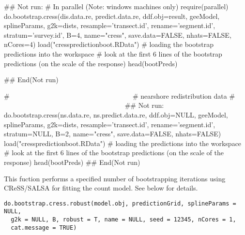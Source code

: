 \documentclass[a4paper]{book}
\begin{document}
\begin{Examples}
\begin{ExampleCode}
## Not run: 
# In parallel (Note: windows machines only)
require(parallel)
do.bootstrap.cress(dis.data.re, predict.data.re, ddf.obj=result, geeModel, splineParams,
                g2k=dists, resample='transect.id', rename='segment.id', stratum='survey.id',
                B=4, name="cress", save.data=FALSE, nhats=FALSE, nCores=4)
load("cresspredictionboot.RData") # loading the bootstrap predictions into the workspace
# look at the first 6 lines of the bootstrap predictions (on the scale of the response)
head(bootPreds)

## End(Not run)

# ~~~~~~~~~~~~~~~~~~~~~~~~~~~~~~~~~~~
# nearshore redistribution data
# ~~~~~~~~~~~~~~~~~~~~~~~~~~~~~~~~~~~
## Not run: 
do.bootstrap.cress(ns.data.re, ns.predict.data.re, ddf.obj=NULL, geeModel, splineParams, 
             g2k=dists, resample='transect.id', rename='segment.id', stratum=NULL, 
             B=2, name="cress", save.data=FALSE, nhats=FALSE)
load("cresspredictionboot.RData") # loading the predictions into the workspace
# look at the first 6 lines of the bootstrap predictions (on the scale of the response)
head(bootPreds)
## End(Not run)

\end{ExampleCode}
\end{Examples}
%
\begin{Description}\relax
This fuction performs a specified number of bootstrapping iterations using CReSS/SALSA for fitting the count model. See below for details.
\end{Description}
%
\begin{Usage}
\begin{verbatim}
do.bootstrap.cress.robust(model.obj, predictionGrid, splineParams = NULL,
  g2k = NULL, B, robust = T, name = NULL, seed = 12345, nCores = 1,
  cat.message = TRUE)
\end{verbatim}
\end{Usage}
%
\end{document}

